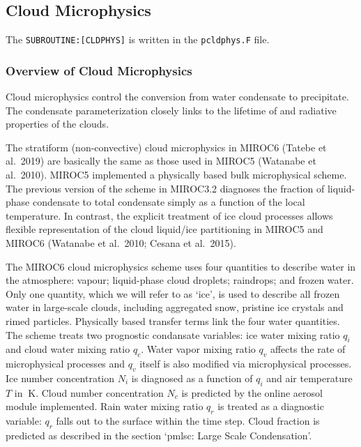 \hypertarget{cloud-microphysics}{%
\subsection{Cloud Microphysics}\label{cloud-microphysics}}

The \texttt{SUBROUTINE:{[}CLDPHYS{]}} is written in the \texttt{pcldphys.F} file.

\hypertarget{overview-of-cloud-microphysics}{%
\subsubsection{Overview of Cloud Microphysics}\label{overview-of-cloud-microphysics}}

Cloud microphysics control the conversion from water condensate to precipitate. The condensate parameterization closely links to the lifetime of and radiative properties of the clouds.

The stratiform (non-convective) cloud microphysics in MIROC6 (Tatebe et al.~2019) are basically the same as those used in MIROC5 (Watanabe et al.~2010). MIROC5 implemented a physically based bulk
microphysical scheme. The previous version of the scheme in MIROC3.2 diagnoses the fraction of liquid-phase condensate to total condensate simply as a function of the local temperature. In contrast,
the explicit treatment of ice cloud processes allows flexible representation of the cloud liquid/ice partitioning in MIROC5 and MIROC6 (Watanabe et al.~2010; Cesana et al.~2015).

The MIROC6 cloud microphysics scheme uses four quantities to describe water in the atmosphere: vapour; liquid-phase cloud droplets; raindrops; and frozen water. Only one quantity, which we will refer
to as `ice', is used to describe all frozen water in large-scale clouds, including aggregated snow, pristine ice crystals and rimed particles. Physically based transfer terms link the four water
quantities. The scheme treats two prognostic condansate variables: ice water mixing ratio \(q_i\) and cloud water mixing ratio \(q_c\). Water vapor mixing ratio \(q_v\) affects the rate of
microphysical processes and \(q_v\) itself is also modified via microphysical processes. Ice number concentration \(N_i\) is diagnosed as a function of \(q_i\) and air temperature \(T\) in
\(\mathrm{~K}\). Cloud number concentration \(N_c\) is predicted by the online aerosol module implemented. Rain water mixing ratio \(q_r\) is treated as a diagnostic variable: \(q_r\) falls out to the
surface within the time step. Cloud fraction is predicted as described in the section `pmlsc: Large Scale Condensation'.


